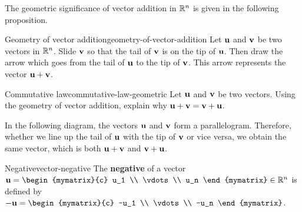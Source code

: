 The geometric significance of vector addition in $\mathbb{R}^n$ is given in
the following proposition.

\begin{proposition}{Geometry of vector addition}{geometry-of-vector-addition}
  Let $\vect{u}$ and $\vect{v}$ be two vectors in $\mathbb{R}^n$. Slide
  $\vect{v}$ so that the tail of $\vect{v}$ is on the tip of
  $\vect{u}$. Then draw the arrow which goes from the tail of
  $\vect{u}$ to the tip of $\vect{v}$.  This arrow represents the
  vector $\vect{u}+\vect{v}$.

  \begin{center}
  \end{center}
\end{proposition}

\begin{example}{Commutative law}{commutative-law-geometric}
  Let $\vect{u}$ and $\vect{v}$ be two vectors. Using the geometry of
  vector addition, explain why $\vect{u}+\vect{v} = \vect{v} + \vect{u}$.
\end{example}

\begin{solution}
  In the following diagram, the vectors $\vect{u}$ and $\vect{v}$ form
  a parallelogram. Therefore, whether we line up the tail of
  $\vect{u}$ with the tip of $\vect{v}$ or vice versa, we obtain the
  same vector, which is both $\vect{u}+\vect{v}$ and
  $\vect{v}+\vect{u}$.
  \begin{center}
  \end{center}
\end{solution}

\begin{definition}{Negative}{vector-negative}
  The \textbf{negative}%
   of a vector
  $\vect{u}=\begin{mymatrix}{c}
    u_1 \\
    \vdots \\
    u_n
  \end{mymatrix}\in\R^n$ is defined by
  $-\vect{u} = \begin{mymatrix}{c}
    -u_1 \\
    \vdots \\
    -u_n
  \end{mymatrix}$.
\end{definition}

